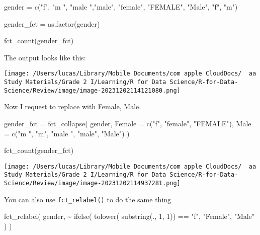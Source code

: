 \documentclass[
]{article}
\newenvironment{Shaded}{}{}
\newcommand{\AttributeTok}[1]{\textcolor[rgb]{0.49,0.56,0.16}{#1}}
\newcommand{\DecValTok}[1]{\textcolor[rgb]{0.25,0.63,0.44}{#1}}
\newcommand{\FunctionTok}[1]{\textcolor[rgb]{0.02,0.16,0.49}{#1}}
\newcommand{\NormalTok}[1]{#1}
\newcommand{\OtherTok}[1]{\textcolor[rgb]{0.00,0.44,0.13}{#1}}
\newcommand{\SpecialCharTok}[1]{\textcolor[rgb]{0.25,0.44,0.63}{#1}}
\newcommand{\StringTok}[1]{\textcolor[rgb]{0.25,0.44,0.63}{#1}}
\begin{document}
\begin{Shaded}
\begin{Highlighting}[]
\NormalTok{gender }\OtherTok{=}
	\FunctionTok{c}\NormalTok{(}\StringTok{"f"}\NormalTok{, }\StringTok{"m "}\NormalTok{, }\StringTok{"male "}\NormalTok{,}\StringTok{"male"}\NormalTok{, }\StringTok{"female"}\NormalTok{, }\StringTok{"FEMALE"}\NormalTok{, }\StringTok{"Male"}\NormalTok{, }\StringTok{"f"}\NormalTok{, }\StringTok{"m"}\NormalTok{)}

\NormalTok{gender\_fct }\OtherTok{=}
  \FunctionTok{as.factor}\NormalTok{(gender)}

\FunctionTok{fct\_count}\NormalTok{(gender\_fct)}
\end{Highlighting}
\end{Shaded}

The output looks like this:

\texttt{[image: /Users/lucas/Library/Mobile Documents/com~apple~CloudDocs/~~aa Study Materials/Grade 2 I/Learning/R for Data Science/R-for-Data-Science/Review/image/image-20231202114121080.png]}

Now I request to replace with Female, Male.

\begin{Shaded}
\begin{Highlighting}[]
\NormalTok{gender\_fct }\OtherTok{=}
  \FunctionTok{fct\_collapse}\NormalTok{(}
\NormalTok{    gender,}
    \AttributeTok{Female =} \FunctionTok{c}\NormalTok{(}\StringTok{"f"}\NormalTok{, }\StringTok{"female"}\NormalTok{, }\StringTok{"FEMALE"}\NormalTok{),}
    \AttributeTok{Male =} \FunctionTok{c}\NormalTok{(}\StringTok{"m "}\NormalTok{, }\StringTok{"m"}\NormalTok{, }\StringTok{"male "}\NormalTok{, }\StringTok{"male"}\NormalTok{, }\StringTok{"Male"}\NormalTok{)}
\NormalTok{  )}

\FunctionTok{fct\_count}\NormalTok{(gender\_fct)}
\end{Highlighting}
\end{Shaded}

\texttt{[image: /Users/lucas/Library/Mobile Documents/com~apple~CloudDocs/~~aa Study Materials/Grade 2 I/Learning/R for Data Science/R-for-Data-Science/Review/image/image-20231202114937281.png]}

You can also use \texttt{fct\_relabel()} to do the same thing

\begin{Shaded}
\begin{Highlighting}[]
\FunctionTok{fct\_relabel}\NormalTok{(}
\NormalTok{  gender,}
  \SpecialCharTok{\textasciitilde{}} \FunctionTok{ifelse}\NormalTok{(}
    \FunctionTok{tolower}\NormalTok{(}
      \FunctionTok{substring}\NormalTok{(., }\DecValTok{1}\NormalTok{, }\DecValTok{1}\NormalTok{)) }\SpecialCharTok{==} \StringTok{"f"}\NormalTok{,}
    \StringTok{"Female"}\NormalTok{,}
    \StringTok{"Male"}
\NormalTok{  )}
\NormalTok{)}
\end{Highlighting}
\end{Shaded}
\end{document}
